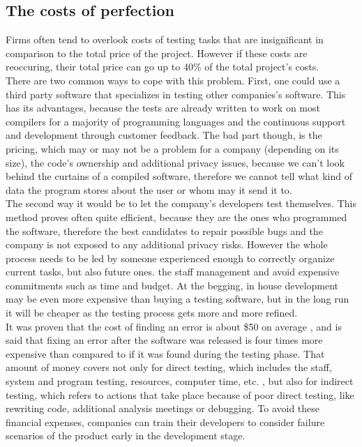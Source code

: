 \subsection{The costs of perfection}
\label{costs}
Firms often tend to overlook costs of testing tasks that are insignificant in comparison to the total price of the project. However if these costs are reoccuring, their total price can go up to 40\% of the total project's costs\cite{8822082}.\\
There are two common ways to cope with this problem. First, one could use a third party software that specializes in testing other companies's software. This has its advantages, because the tests are already written to work on most compilers for a majority of programming languages and the continuous support and development through customer feedback. The bad part though, is the pricing, which may or may not be a problem for a company (depending on its size), the code's ownership and additional privacy issues, because we can't look behind the curtains of a compiled software, therefore we cannot tell what kind of data the program stores about the user or whom may it send it to.\\
The second way it would be to let the company's developers test themselves. This method proves often quite efficient, because they are the ones who programmed the software, therefore the best candidates to repair possible bugs and the company is not exposed to any additional privacy risks. However the whole process needs to be led by someone experienced enough to correctly organize current tasks, but also future ones. the staff management and avoid expensive commitments such as time and budget. At the begging, in house development may be even more expensive than buying a testing software, but in the long run it will be cheaper as the testing process gets more and more refined.\\
It was proven that the cost of finding an error is about \$50 on average \cite{10.1145/1010773.1010774}, and is said that fixing an error after the software was released is four times more expensive than compared to if it was found during the testing phase\cite{10.1007/978-981-10-8848-3_46}. That amount of money covers not only for direct testing, which includes the staff, system and program testing, resources, computer time, etc. , but also for indirect testing, which refers to actions that take place because of poor direct testing, like rewriting code, additional analysis meetings or debugging. To avoid these financial expenses, companies can train their developers to consider failure scenarios of the product early in the development stage.

